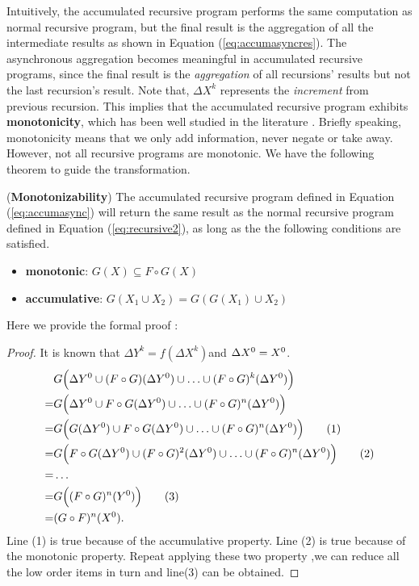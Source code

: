 Intuitively, the accumulated recursive program performs the same computation as normal recursive program, but the final result is the aggregation of all the intermediate results as shown in Equation (\ref{eq:accumasyncres}). The asynchronous aggregation becomes meaningful in accumulated recursive programs, since the final result is the \emph{aggregation} of all recursions' results but not the last recursion's result. Note that, $\Delta X^{k}$ represents the \emph{increment} from previous recursion. This implies that the accumulated recursive program exhibits \textbf{monotonicity}, which has been well studied in the literature \cite{Hellerstein:2010:DIE:1860702.1860704,calm,Lam:2013:SDE:2510649.2511289,Wang:2015:AFR:2824032.2824052}. Briefly speaking, monotonicity means that we only add information, never negate or take away. However, not all recursive programs are monotonic. We have the following theorem to guide the transformation.
\begin{theorem}
	\label{th:monotone}
	(\textbf{Monotonizability}) The accumulated recursive program defined in Equation (\ref{eq:accumasync}) will return the same result as the normal recursive program defined in Equation (\ref{eq:recursive2}), as long as the the following conditions are satisfied.
	\begin{itemize}
		\item \textbf{monotonic}: $G(X)\subseteq F\circ G(X)$
		\item \textbf{accumulative}: $G(X_1\cup X_2)=G(G(X_1)\cup X_2)$
	\end{itemize}
	
\end{theorem}
Here we provide the formal proof :
 \begin{proof}
  It is known that $\Delta Y^k=f(\Delta X^k)$and $\Delta X^0=X^0\\$.
 \begin{align}
 &G\Big(\Delta Y^0\cup (F\circ G)(\Delta Y^0)\cup\ldots\cup (F\circ G)^k(\Delta Y^0)\Big)\notag \\
 =&G\Big(\Delta Y^0\cup F\circ G(\Delta Y^0)\cup \ldots \cup (F\circ G)^n(\Delta Y^0)\Big)    \notag\\
 =&G\Big(G(\Delta Y^0)\cup F\circ G(\Delta Y^0)\cup \ldots \cup (F\circ G)^n( \Delta Y^0)\Big)  \tag{1}\\
 =&G\Big(F\circ G(\Delta Y^0)\cup (F\circ G)^2(\Delta Y^0)\cup \ldots \cup (F\circ G)^n(\Delta Y^0)\Big) \tag{2}\\
 =& \ldots \notag \\
 =&G\Big((F\circ G)^n(Y^0)\Big)\tag{3}\\
 =&(G \circ F)^n(X^0).\notag
 \end{align}
  Line (1) is true because of the accumulative property. Line (2) is true because of the monotonic property. Repeat applying these two property ,we can reduce all the low order items in turn and line(3) can be obtained. 
 \end{proof}


